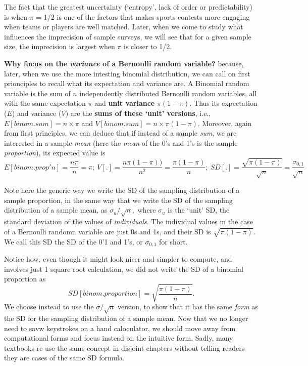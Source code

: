 \documentclass[]{book}
\begin{document}
The fact that the greatest uncertainty (`entropy', lack of order or predictability) is when \(\pi\) = 1/2 is one of the factors that makes sports contests more engaging when teams or players are well matched. Later, when we come to study what influences the imprecision of sample surveys, we will see that for a given sample size, the imprecision is largest when \(\pi\) is closer to 1/2.

\textbf{Why focus on the \emph{variance} of a Bernoulli random variable?} because, later, when we use the more intesting binomial distribution, we can call on first prionciples to recall what its expectation and variance are. A Binomial random variable is the sum of \(n\) independently distributed Bernoulli random variables, all with the same expectation \(\pi\) and \textbf{unit variance} \(\pi(1-\pi).\) Thus its expectation (\(E\)) and variance (\(V\)) are the \textbf{sums of these `unit' versions}, i.e., \(E[binom.sum] = n \times \pi\) and \(V[binom.sum] = n \times \pi(1-\pi).\) Moreover, again from first principles, we can deduce that if instead of a sample \emph{sum}, we are interested in a sample \emph{mean} (here the \emph{mean} of the 0's and 1's is the sample \emph{proportion}), its expected value is
\[\boxed{\boxed{E[binom.prop'n] = \frac{n \pi}{n} = \pi; \   V[.] = \frac{n  \pi(1-\pi))}{n^2} = \frac{\pi(1-\pi)}{n}; \ SD[.] = \frac{\sqrt{\pi(1-\pi)}}{ \sqrt{n}} = \frac{\sigma_{0,1}}{\sqrt{n}} } }  \]

Note here the generic way we write the SD of the sampling distribution of a sample proportion, in the same way that we write the SD of the sampling distribution of a sample mean, as \(\sigma_u/\sqrt{n},\) where \(\sigma_u\) is the `unit' SD, the standard deviation of the values of \emph{individuals}. The individual values in the case of a Bernoulli randomn variable are just 0s and 1s, and their SD is \(\sqrt{\pi(1-\pi)}.\) We call this SD the SD of the 0'1 and 1's, or \(\sigma_{0,1}\) for short.

Notice how, even though it might look nicer and simpler to compute, and involves just 1 square root calculation, we did not write the SD of a binomial proportion as\\
\[SD[binom.proportion] = \sqrt{\frac{\pi(1-\pi)}{ n} }.\]
We choose instead to use the \(\sigma/\sqrt{n}\) version, to show that it has the same \emph{form} as the SD for the sampling distribution of a sample mean. Now that we no longer need to savw keystrokes on a hand caloculator, we should move away from computational forms and focus instead on the intuitive form. Sadly, many textbooks re-use the same concept in disjoint chapters without telling readers they are cases of the same SD formula.
\end{document}
